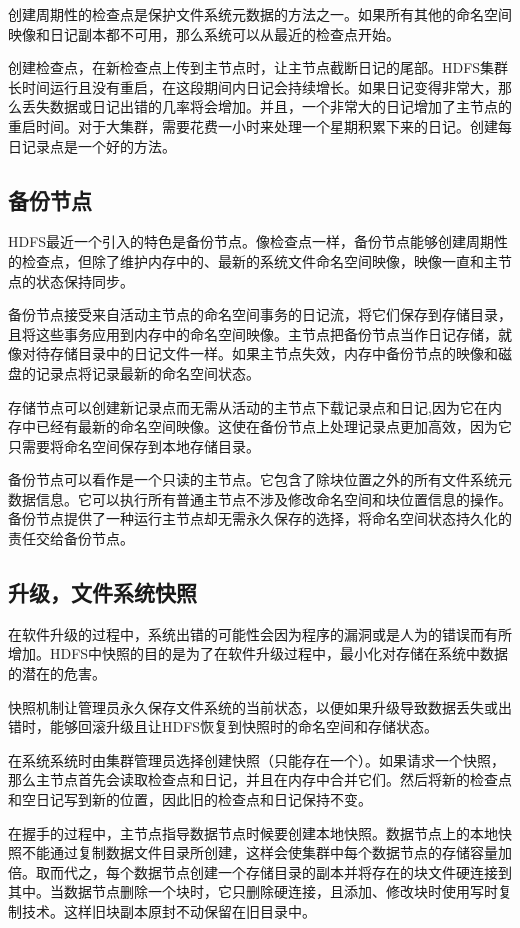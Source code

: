 创建周期性的检查点是保护文件系统元数据的方法之一。如果所有其他的命名空间映像和日记副本都不可用，那么系统可以从最近的检查点开始。

创建检查点，在新检查点上传到主节点时，让主节点截断日记的尾部。HDFS集群长时间运行且没有重启，在这段期间内日记会持续增长。如果日记变得非常大，那么丢失数据或日记出错的几率将会增加。并且，一个非常大的日记增加了主节点的重启时间。对于大集群，需要花费一小时来处理一个星期积累下来的日记。创建每日记录点是一个好的方法。

\subsection{备份节点}

HDFS最近一个引入的特色是备份节点。像检查点一样，备份节点能够创建周期性的检查点，但除了维护内存中的、最新的系统文件命名空间映像，映像一直和主节点的状态保持同步。

备份节点接受来自活动主节点的命名空间事务的日记流，将它们保存到存储目录，且将这些事务应用到内存中的命名空间映像。主节点把备份节点当作日记存储，就像对待存储目录中的日记文件一样。如果主节点失效，内存中备份节点的映像和磁盘的记录点将记录最新的命名空间状态。

存储节点可以创建新记录点而无需从活动的主节点下载记录点和日记,因为它在内存中已经有最新的命名空间映像。这使在备份节点上处理记录点更加高效，因为它只需要将命名空间保存到本地存储目录。

备份节点可以看作是一个只读的主节点。它包含了除块位置之外的所有文件系统元数据信息。它可以执行所有普通主节点不涉及修改命名空间和块位置信息的操作。备份节点提供了一种运行主节点却无需永久保存的选择，将命名空间状态持久化的责任交给备份节点。

\subsection{升级，文件系统快照}

在软件升级的过程中，系统出错的可能性会因为程序的漏洞或是人为的错误而有所增加。HDFS中快照的目的是为了在软件升级过程中，最小化对存储在系统中数据的潜在的危害。

快照机制让管理员永久保存文件系统的当前状态，以便如果升级导致数据丢失或出错时，能够回滚升级且让HDFS恢复到快照时的命名空间和存储状态。

在系统系统时由集群管理员选择创建快照（只能存在一个）。如果请求一个快照，那么主节点首先会读取检查点和日记，并且在内存中合并它们。然后将新的检查点和空日记写到新的位置，因此旧的检查点和日记保持不变。

在握手的过程中，主节点指导数据节点时候要创建本地快照。数据节点上的本地快照不能通过复制数据文件目录所创建，这样会使集群中每个数据节点的存储容量加倍。取而代之，每个数据节点创建一个存储目录的副本并将存在的块文件硬连接到其中。当数据节点删除一个块时，它只删除硬连接，且添加、修改块时使用写时复制技术。这样旧块副本原封不动保留在旧目录中。

